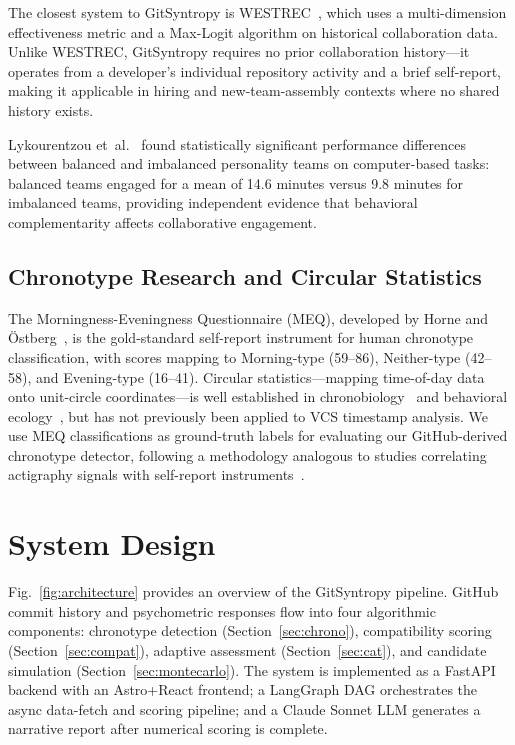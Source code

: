 \documentclass[conference]{IEEEtran}
\begin{document}
The closest system to GitSyntropy is WESTREC~\cite{qiao2022westrec},
which uses a multi-dimension effectiveness metric and a Max-Logit
algorithm on historical collaboration data.
Unlike WESTREC, GitSyntropy requires no prior collaboration
history—it operates from a developer's individual repository activity
and a brief self-report, making it applicable in hiring and
new-team-assembly contexts where no shared history exists.

Lykourentzou et~al.~\cite{lykourentzou2019compatibility} found
statistically significant performance differences between balanced
and imbalanced personality teams on computer-based tasks: balanced
teams engaged for a mean of 14.6 minutes versus 9.8 minutes for
imbalanced teams, providing independent evidence that behavioral
complementarity affects collaborative engagement.

\subsection{Chronotype Research and Circular Statistics}

The Morningness-Eveningness Questionnaire (MEQ), developed by Horne
and \"{O}stberg~\cite{horne1976meq}, is the gold-standard self-report
instrument for human chronotype classification, with scores mapping to
Morning-type (59–86), Neither-type (42–58), and Evening-type (16–41).
Circular statistics—mapping time-of-day data onto unit-circle
coordinates—is well established in chronobiology~\cite{batschelet1981}
and behavioral ecology~\cite{pewsey2018circular}, but has not
previously been applied to VCS timestamp analysis.
We use MEQ classifications as ground-truth labels for evaluating our
GitHub-derived chronotype detector, following a methodology analogous
to studies correlating actigraphy signals with self-report
instruments~\cite{fischer2007applying}.

\section{System Design}
\label{sec:design}

Fig.~\ref{fig:architecture} provides an overview of the GitSyntropy
pipeline.
GitHub commit history and psychometric responses flow into four
algorithmic components: chronotype detection
(Section~\ref{sec:chrono}), compatibility scoring
(Section~\ref{sec:compat}), adaptive assessment
(Section~\ref{sec:cat}), and candidate simulation
(Section~\ref{sec:montecarlo}).
The system is implemented as a FastAPI backend with an Astro+React
frontend; a LangGraph DAG orchestrates the async data-fetch and
scoring pipeline; and a Claude Sonnet LLM generates a narrative
report after numerical scoring is complete.
\end{document}
